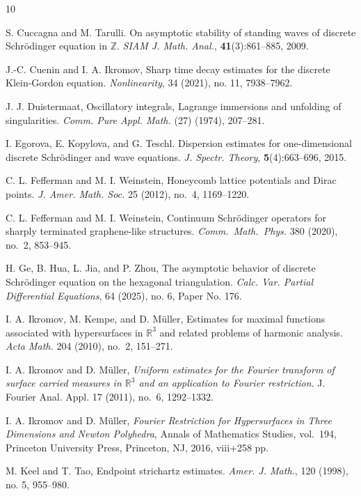 \documentclass[12pt]{amsart}
\begin{document}
\begin{thebibliography}{10}
  
		S. Cuccagna and M. Tarulli.
		On asymptotic stability of standing waves of discrete Schrödinger equation in $\mathbb{Z}$.
		\emph{SIAM J. Math. Anal.}, \textbf{41}(3):861--885, 2009.
		
	 J.-C. Cuenin and I. A. Ikromov, Sharp time decay estimates for the discrete Klein-Gordon equation. \emph{Nonlinearity}, 34 (2021), no. 11, 7938–7962.	

        J. J. Duistermaat, Oscillatory integrals, Lagrange immersions and unfolding of singularities.
        \emph{Comm. Pure Appl.  Math.} (27) (1974), 207--281.

		I. Egorova, E. Kopylova, and G. Teschl.
		Dispersion estimates for one-dimensional discrete Schrödinger and wave equations.
		\emph{J. Spectr. Theory}, \textbf{5}(4):663--696, 2015.
		
C. L. Fefferman and M. I. Weinstein, Honeycomb lattice potentials and Dirac points. \emph{J. Amer. Math. Soc.}
 25 (2012), no.~4, 1169--1220.
		

C. L. Fefferman and M. I. Weinstein, Continuum {S}chr\"odinger operators for sharply terminated
  graphene-like structures.
\emph{Comm.\ Math.\ Phys.} 380 (2020), no.~2, 853--945.

 H. Ge, B. Hua, L. Jia, and P. Zhou, The asymptotic behavior of discrete Schrödinger equation on the hexagonal triangulation. \emph{Calc. Var. Partial Differential Equations}, 64 (2025), no. 6, Paper No. 176.

I. A. Ikromov, M. Kempe, and D. M{\"u}ller,
Estimates for maximal functions associated with hypersurfaces in
  $\mathbb{R}^{3}$ and related problems of harmonic analysis.
\emph{Acta Math.} 204 (2010), no.~2, 151--271.


        I. A. Ikromov and D. Müller,
        \emph{Uniform estimates for the Fourier transform of surface carried measures in $\mathbb{R}^{3}$ and an application to Fourier restriction}. J. Fourier Anal. Appl. 17 (2011), no.~6, 1292--1332.

        I. A. Ikromov and D. Müller, \emph{Fourier Restriction for Hypersurfaces in Three Dimensions and Newton Polyhedra}, Annals of Mathematics Studies, vol.\ 194, Princeton University Press, Princeton, NJ, 2016, viii+258 pp.

        
		
		M. Keel and T. Tao, Endpoint strichartz estimates.
		\emph{Amer. J. Math.}, 120 (1998), no. 5, 955–980.
		

\end{thebibliography}
\end{document}
